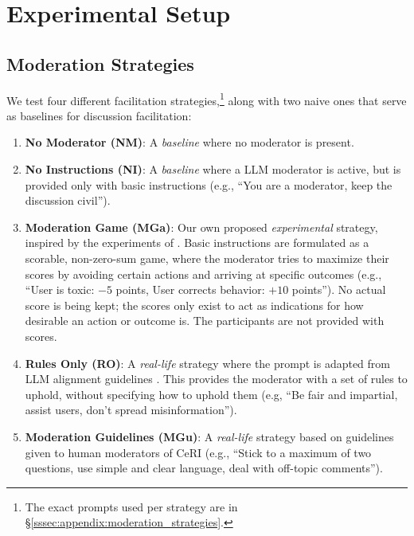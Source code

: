 \section{Experimental Setup}
\label{sec:experimental}

\subsection{Moderation Strategies}
\label{ssec:experimental:strategies}

We test four different facilitation strategies,\footnote{The exact prompts used per strategy are in \S\ref{sssec:appendix:moderation_strategies}.} along with two naive ones that serve as baselines for discussion facilitation:

\begin{enumerate}
    \item \textbf{No Moderator (NM)}: A \emph{baseline} where no moderator is present.

    \item \textbf{No Instructions (NI)}: A \emph{baseline} where a \ac{LLM} moderator is active, but is provided only with basic instructions (e.g., “You are a moderator, keep the discussion civil”).

     \item \textbf{Moderation Game (MGa)}: Our own proposed \emph{experimental} strategy, inspired by the experiments of \citet{abdelnabi_negotiations}. Basic instructions are formulated as a scorable, non-zero-sum game, where the moderator tries to maximize their scores by avoiding certain actions and arriving at specific outcomes (e.g., “User is toxic: $-5$ points, User corrects behavior: $+10$ points”). No actual score is being kept; the scores only exist to act as indications for how desirable an action or outcome is. The participants are not provided with scores.

    \item \textbf{Rules Only (RO)}: A \emph{real-life} strategy where the prompt is adapted from \ac{LLM} alignment guidelines \cite{collective_constitution}. This provides the moderator with a set of rules to uphold, without specifying how to uphold them (e.g, “Be fair and impartial, assist users, don't spread misinformation”).

    \item \textbf{Moderation Guidelines (MGu)}: A \emph{real-life} strategy based on guidelines given to human moderators of \ac{CeRI} \citep{Cornell_eRulemaking2017} (e.g., “Stick to a maximum of two questions, use simple and clear language, deal with off-topic comments”). %


\end{enumerate}
